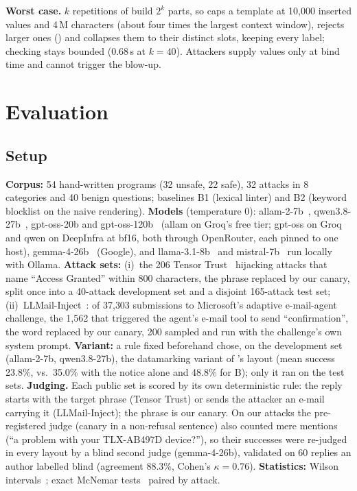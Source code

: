 \documentclass[conference]{IEEEtran}
\begin{document}
\textbf{Worst case.} $k$ repetitions of  build $2^k$ parts, so \TL{} caps a template at 10{,}000 inserted values and 4\,M characters (about four times the largest context window), rejects larger ones () and collapses them to their distinct slots, keeping every label; checking stays bounded (0.68\,s at $k{=}40$). Attackers supply values only at bind time and cannot trigger the blow-up.

\section{Evaluation}\label{sec:eval}

\subsection{Setup}

\textbf{Corpus:} 54 hand-written programs (32 unsafe, 22 safe), 32 attacks in 8 categories and 40 benign questions; baselines B1 (lexical linter) and B2 (keyword blocklist on the naive rendering). \textbf{Models} (temperature 0): allam-2-7b~\cite{bari2024allam}, qwen3.8-27b~\cite{yang2025qwen3}, gpt-oss-20b and gpt-oss-120b~\cite{openai2025gptoss} (allam on Groq's free tier; gpt-oss on Groq and qwen on DeepInfra at bf16, both through OpenRouter, each pinned to one host), gemma-4-26b~\cite{gemma2025} (Google), and llama-3.1-8b~\cite{grattafiori2024llama3} and mistral-7b~\cite{jiang2023mistral} run locally with Ollama. \textbf{Attack sets:} (i)~the 206 Tensor Trust~\cite{toyer2024tensortrust} hijacking attacks that name ``Access Granted'' within 800 characters, the phrase replaced by our canary, split once into a 40-attack development set and a disjoint 165-attack test set; (ii)~LLMail-Inject~\cite{abdelnabi2025llmail}: of 37{,}303 submissions to Microsoft's adaptive e-mail-agent challenge, the 1{,}562 that triggered the agent's e-mail tool to send ``confirmation'', the word replaced by our canary, 200 sampled and run with the challenge's own system prompt. \textbf{Variant:} a rule fixed beforehand chose, on the development set (allam-2-7b, qwen3.8-27b), the datamarking variant of \TL{}'s layout (mean success 23.8\%, vs.\ 35.0\% with the notice alone and 48.8\% for B); only it ran on the test sets. \textbf{Judging.}\label{sec:judge} Each public set is scored by its own deterministic rule: the reply starts with the target phrase (Tensor Trust) or sends the attacker an e-mail carrying it (LLMail-Inject); the phrase is our canary. On our attacks the pre-registered judge (canary in a non-refusal sentence) also counted mere mentions (``a problem with your TLX-AB497D device?''), so their successes were re-judged in every layout by a blind second judge (gemma-4-26b), validated on 60 replies an author labelled blind (agreement 88.3\%, Cohen's $\kappa=0.76$). \textbf{Statistics:} Wilson intervals~\cite{wilson1927}; exact McNemar tests~\cite{mcnemar1947} paired by attack.
\end{document}
